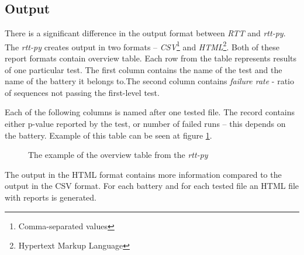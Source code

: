\documentclass[
  digital,     %
  oneside,     %
  nosansbold,  %
  nocolorbold, %
  nolof,         %
  nolot,         %
]{fithesis4}
\begin{document}
\subsection{Output}
There is a significant difference in the output format between \emph{RTT} and \emph{rtt-py}. The \emph{rtt-py} creates output in two formats -- \emph{CSV}\footnote{Comma-separated values} and \emph{HTML}\footnote{Hypertext Markup Language}. Both of these report formats contain overview table. Each row from the table represents results of one particular test. The first column contains the name of the test and the name of the battery it belongs to.The second column contains \emph{failure rate} - ratio of sequences not passing the first-level test.

Each of the following columns is named after one tested file. The record contains either p-value reported by the test, or number of failed runs -- this depends on the battery. Example of this table can be seen at figure \ref{fig:rtt_py_table}.
\begin{figure}
  \begin{center}
  \end{center}
  \caption{The example of the overview table from the \emph{rtt-py}}
  \label{fig:rtt_py_table}
\end{figure}


The output in the HTML format contains more information compared to the output in the CSV format. For each battery and for each tested file an HTML file with reports is generated.
\end{document}
